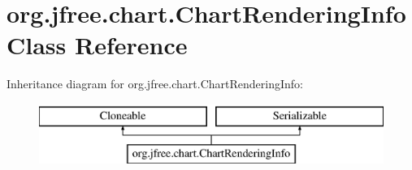 \hypertarget{classorg_1_1jfree_1_1chart_1_1_chart_rendering_info}{}\section{org.\+jfree.\+chart.\+Chart\+Rendering\+Info Class Reference}
\label{classorg_1_1jfree_1_1chart_1_1_chart_rendering_info}
Inheritance diagram for org.\+jfree.\+chart.\+Chart\+Rendering\+Info\+:\begin{figure}[H]
\begin{center}
\leavevmode
\includegraphics[height=2.000000cm]{classorg_1_1jfree_1_1chart_1_1_chart_rendering_info}
\end{center}
\end{figure}
